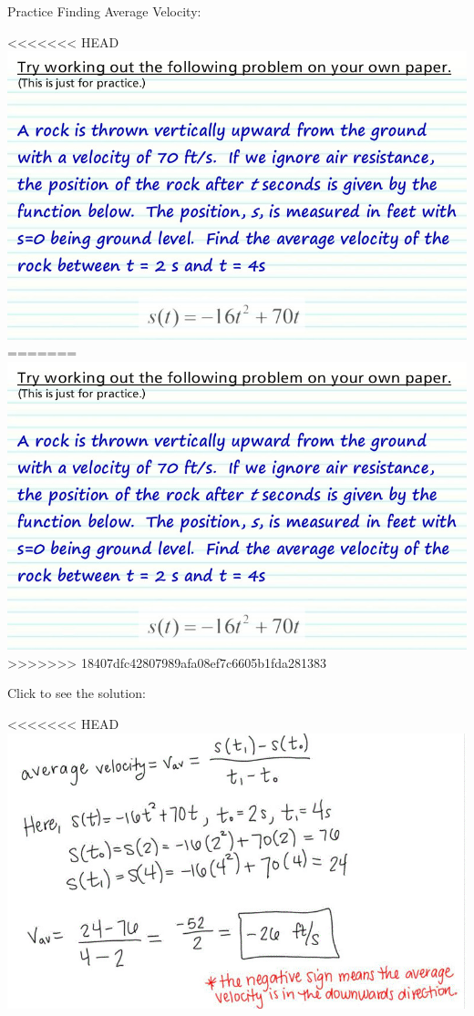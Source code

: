 \documentclass{ximera}
\begin{document}
Practice Finding Average Velocity:
\begin{foldable}
\begin{image}
<<<<<<< HEAD
\includegraphics{picture1.jpg}
=======
\includegraphics{picture1.jpg}
>>>>>>> 18407dfc42807989afa08ef7c6605b1fda281383
\end{image}
Click to see the solution:
\begin{foldable}
\begin{image}
<<<<<<< HEAD
\includegraphics{picture2.jpg}

\end{image}
\end{foldable}
\end{foldable}
\end{document}

